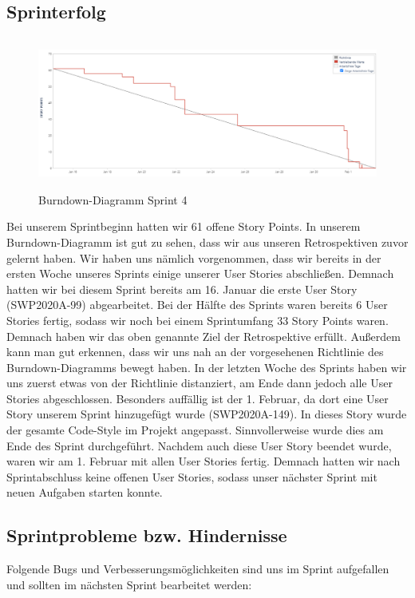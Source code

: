 \documentclass[12pt,a4paper, oneside]{article}
\begin{document}
    \subsection{Sprinterfolg}
    \begin{figure}[h]
        \centering
        \includegraphics[width=\textwidth, height=5cm]{img/sprint_04/Burndown Sprint 4.png}
        \caption{Burndown-Diagramm Sprint 4}
        \label{fig: Burndown-Diagramm Sprint 4}
    \end{figure}
    Bei unserem Sprintbeginn hatten wir 61 offene Story Points. In unserem Burndown-Diagramm ist gut zu sehen, dass wir aus unseren Retrospektiven zuvor gelernt haben. Wir haben uns nämlich vorgenommen, dass wir bereits in der ersten Woche unseres Sprints einige unserer User Stories abschließen. Demnach hatten wir bei diesem Sprint bereits am 16. Januar die erste User Story (SWP2020A-99) abgearbeitet. Bei der Hälfte des Sprints waren bereits 6 User Stories fertig, sodass wir noch bei einem Sprintumfang 33 Story Points waren. Demnach haben wir das oben genannte Ziel der Retrospektive erfüllt. Außerdem kann man gut erkennen, dass wir uns nah an der vorgesehenen Richtlinie des Burndown-Diagramms bewegt haben. In der letzten Woche des Sprints haben wir uns zuerst etwas von der Richtlinie distanziert, am Ende dann jedoch alle User Stories abgeschlossen. Besonders auffällig ist der 1. Februar, da dort eine User Story unserem Sprint hinzugefügt wurde (SWP2020A-149). In dieses Story wurde der gesamte Code-Style im Projekt angepasst. Sinnvollerweise wurde dies am Ende des Sprint durchgeführt. Nachdem auch diese User Story beendet wurde, waren wir am 1. Februar mit allen User Stories fertig. Demnach hatten wir nach Sprintabschluss keine offenen User Stories, sodass unser nächster Sprint mit neuen Aufgaben starten konnte.

    \subsection{Sprintprobleme bzw. Hindernisse}
    Folgende Bugs und Verbesserungsmöglichkeiten sind uns im Sprint aufgefallen und sollten im nächsten Sprint bearbeitet werden:
\end{document}
